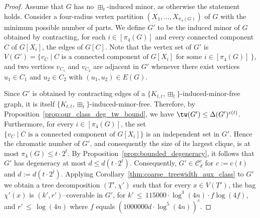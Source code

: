 \begin{proof}
    Assume that $G$ has no $\boxplus_t$-induced minor, as otherwise the statement holds. Consider a four-radius vertex partition $(X_1,\dots,X_{\pi_4(G)})$ of $G$ with the minimum possible number of parts. We define $G'$ to be the induced minor of $G$ obtained by contracting, for each $i \in [\pi_4(G)]$ and every connected component $C$ of $G[X_i]$, the edges of $G[C]$. Note that the vertex set of $G'$ is $V(G') = \{ v_{C} \mid C \text{ is a connected component of } G[X_i] \text{ for some } i \in [\pi_4(G)]\ \}$, and two vertices $v_{C_1}$ and $v_{C_2}$ are adjacent in $G'$ whenever there exist vertices $u_1 \in C_1$ and $u_2 \in C_2$ with $(u_1,u_2) \in E(G)$.

    Since $G'$ is obtained by contracting edges of a $\{K_{t,t}, \boxplus_t\}$-induced-minor-free graph, it is itself $\{K_{t,t}, \boxplus_t\}$-induced-minor-free. Therefore, by Proposition~\ref{prop:our_class_deg_tw_bound}, we have $\tw(G') \leq \Delta(G')^{c(t)}$. Furthermore, for every $i\in[\pi_4(G)]$, the set $\{ v_{C}\mid C \text{ is a connected component of } G[X_i]\}$ is an independent set in $G'$. Hence the chromatic number of $G'$, and consequently the size of its largest clique, is at most $\pi_4(G) \leq t \cdot 2^{t}$. By Proposition~\ref{prop:bounded_degeneracy}, it follows that $G'$ has degeneracy at most $d \leq d(t\cdot 2^{t})$. Consequently, $G' \in \mathcal{C}^c_d$ for $c := c(t)$ and $d := d(t\cdot 2^{t})$.
    Applying Corollary~\ref{thm:coarse_treewidth_aux_class} to $G'$ we obtain a tree decomposition $(T',\chi')$ such that for every $x\in V(T')$, the bag $\chi'(x)$ is $(k', r')$--coverable in $G'$, for $k'\, \leq\, 115000 \cdot \log^3 (4n) \cdot f \log (4f)$, and $r'\, \leq\, \log (4n)$ where $f$ equals $(1000000d\cdot \log^5 (4n))^{c}$.
    

\end{proof}
